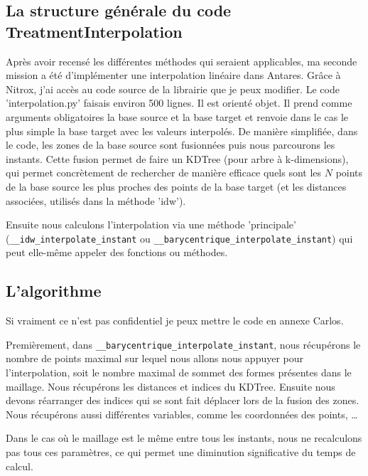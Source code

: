 \subsection{La structure générale du code TreatmentInterpolation}
Après avoir recensé les différentes méthodes qui seraient applicables, ma seconde mission a été d'implémenter une interpolation linéaire dans Antares. Grâce à Nitrox, j'ai accès au code source de la librairie que je peux modifier. Le code 'interpolation.py' faisais environ 500 lignes. Il est orienté objet. Il prend comme arguments obligatoires la base source et la base target et renvoie dans le cas le plus simple la base target avec les valeurs interpolés.
De manière simplifiée, dans le code, les zones de la base source sont fusionnées puis nous parcourons les instants. 
Cette fusion permet de faire un KDTree (pour arbre à k-dimensions), qui permet concrètement de rechercher de manière efficace quels sont les \( N \) points de la base source les plus proches des points de la base target (et les distances associées, utilisés dans la méthode 'idw').

Ensuite nous calculons l'interpolation via une méthode 'principale' (\lstinline{__idw_interpolate_instant} ou
\lstinline{__barycentrique_interpolate_instant}) qui peut elle-même appeler des fonctions ou méthodes.

\subsection{L'algorithme}
Si vraiment ce n'est pas confidentiel je peux mettre le code en annexe Carlos.

Premièrement, dans \lstinline{__barycentrique_interpolate_instant}, nous récupérons le nombre de points maximal sur lequel nous allons nous appuyer pour l'interpolation, soit le nombre maximal de sommet des formes présentes dans le maillage.
Nous récupérons les distances et indices du KDTree.
Ensuite nous devons réarranger des indices qui se sont fait déplacer lors de la fusion des zones.
Nous récupérons aussi différentes variables, comme les coordonnées des points, \dots



Dans le cas où le maillage est le même entre tous les instants, nous ne recalculons pas tous ces paramètres, ce qui permet une diminution significative du temps de calcul.




